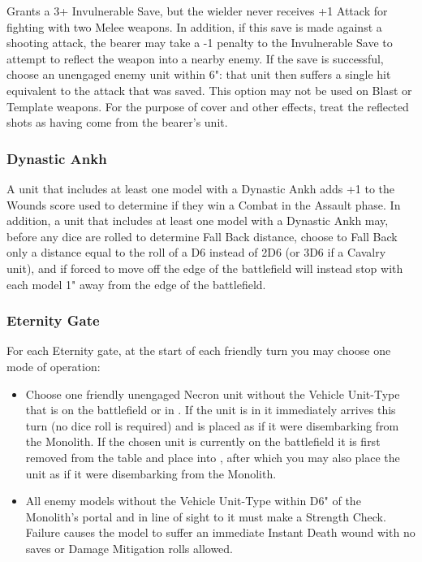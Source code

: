 Grants a 3+ Invulnerable Save, but the wielder never receives +1 Attack for fighting with two Melee weapons. In addition, if this save is made against a shooting attack, the bearer may take a -1 penalty to the Invulnerable Save to attempt to reflect the weapon into a nearby enemy. If the save is successful, choose an unengaged enemy unit within 6": that unit then suffers a single hit equivalent to the attack that was saved. This option may not be used on Blast or Template weapons. For the purpose of cover and other effects, treat the reflected shots as having come from the bearer's unit.

\subsubsection{Dynastic Ankh} \label{Dynastic Ankh}

A unit that includes at least one model with a Dynastic Ankh adds +1 to the Wounds score used to determine if they win a Combat in the Assault phase. In addition, a unit that includes at least one model with a Dynastic Ankh may, before any dice are rolled to determine Fall Back distance, choose to Fall Back only a distance equal to the roll of a D6 instead of 2D6 (or 3D6 if a Cavalry unit), and if forced to move off the edge of the battlefield will instead stop with each model 1" away from the edge of the battlefield.

\subsubsection{Eternity Gate} \label{Eternity Gate}

For each Eternity gate, at the start of each friendly turn you may choose one mode of operation:

\begin{itemize}
	\item Choose one friendly unengaged Necron unit without the Vehicle Unit-Type that is on the battlefield or in . If the unit is in  it immediately arrives this turn (no dice roll is required) and is placed as if it were disembarking from the Monolith. If the chosen unit is currently on the battlefield it is first removed from the table and place into , after which you may also place the unit as if it were disembarking from the Monolith.
	\item All enemy models without the Vehicle Unit-Type within D6" of the Monolith's portal and in line of sight to it must make a Strength Check. Failure causes the model to suffer an immediate Instant Death wound with no saves or Damage Mitigation rolls allowed.
\end{itemize}

